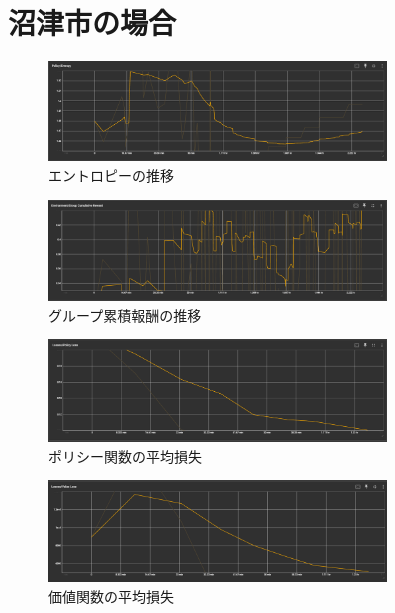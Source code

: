 \section{沼津市の場合}
\begin{figure}[H] 
  \centering 
  \includegraphics[width=0.8\textwidth]{Figures/NumazuEntropy.png}
  \caption{エントロピーの推移} 
  \label{fig:fig-01}
\end{figure}
\begin{figure}[H] 
  \centering 
  \includegraphics[width=0.8\textwidth]{Figures/NumazuGroupReward.png}
  \caption{グループ累積報酬の推移} 
  \label{fig:fig-01}
\end{figure}
\begin{figure}[H] 
  \centering 
  \includegraphics[width=0.8\textwidth]{Figures/NumazuPolicyLoss.png}
  \caption{ポリシー関数の平均損失} 
  \label{fig:fig-01}
\end{figure}
\begin{figure}[H] 
  \centering 
  \includegraphics[width=0.8\textwidth]{Figures/NumazuValueLoss.png}
  \caption{価値関数の平均損失} 
  \label{fig:fig-01}
\end{figure}

